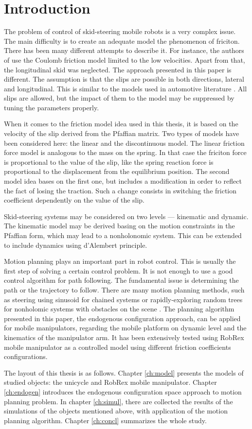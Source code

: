 \chapter{Introduction}
The problem of control of skid-steering mobile robots is a very complex issue. 
The main difficulty is to create an adequate model the phenomenon of friciton. 
There has been many different attempts to describe it.
For instance, the authors of \cite{caracciolo1999trajectory} use the Coulomb friction model limited to the low velocities.
Apart from that, the longitudinal skid was neglected. The approach presented in this paper is different.
The assumption is that the slips are possible in both directions, lateral and longitudinal.
This is similar to the models used in automotive literature \cite{pacejka2005tyre}.
All slips are allowed, but the impact of them to the model may be suppressed by tuning the
parameters properly. 

When it comes to the friction model idea used in this thesis,
it is based on the velocity of the slip derived
from the Pfaffian matrix. %
Two types of models have been considered here: the linear and the discontinuous model.
The linear friction force model is analogous to the mass on the spring. In that case the friciton
force is proportional to the value of the slip, like the spring reaction force is proportional
to the displacement from the equilibrium position. The second model idea bases on the first one,
but includes a modification in order to reflect the fact of losing the traction. Such a change
consists in switching the friction coefficient dependently on the value of the slip.

Skid-steering systems may be considered on two levels --- kinematic and dynamic.
The kinematic model may be derived basing on the motion constraints in the Pfaffian form, which may lead
to a nonholonomic system. This can be extended to include dynamics using d'Alembert principle.

Motion planning plays an important part in robot control. This is usually the first step of solving
a certain control problem. It is not enough to use a good control algorithm for path following. The fundamental
issue is determining the path or the trajectory to follow. There are many motion planning methods,
such as steering using sinusoid for chained systems \cite{murray1993nonholonomic} or rapidly-exploring random trees for nonholomic systems
with obstacles on the scene \cite{lavalle2000rapidly}. The planning algorithm presented in this paper,
the endogenous configuration approach, can be applied for mobile manipulators, regarding the
mobile platform on dynamic level and the kinematics of the manipulator arm. It has been extensively
tested using RobRex mobile manipulator as a controlled model using different
friction coefficients configurations.

The layout of this thesis is as follows. Chapter \ref{ch:model} presents the models of studied
objects: the unicycle and RobRex mobile manipulator. Chapter \ref{ch:endogen} introduces the endogenous
configuration space approach to motion planning problem. In chapter \ref{ch:simul}, there are collected
the results of the simulations of the objects mentioned above, with application of the motion
planning algorithm. Chapter \ref{ch:concl} summarizes the whole study.